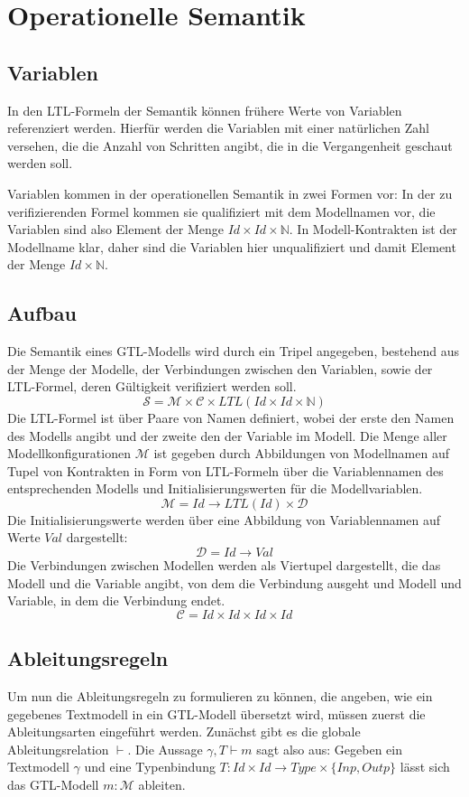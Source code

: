 \section{Operationelle Semantik}
\subsection{Variablen}
In den LTL-Formeln der Semantik können frühere Werte von Variablen referenziert werden.
Hierfür werden die Variablen mit einer natürlichen Zahl versehen, die die Anzahl von Schritten angibt, die in die Vergangenheit geschaut werden soll.

Variablen kommen in der operationellen Semantik in zwei Formen vor:
In der zu verifizierenden Formel kommen sie qualifiziert mit dem Modellnamen vor, die Variablen sind also Element der Menge $\mathit{Id}\times\mathit{Id}\times\mathbb{N}$.
In Modell-Kontrakten ist der Modellname klar, daher sind die Variablen hier unqualifiziert und damit Element der Menge $\mathit{Id}\times\mathbb{N}$.
\subsection{Aufbau}
Die Semantik eines GTL-Modells wird durch ein Tripel angegeben, bestehend aus der Menge der Modelle, der Verbindungen zwischen den Variablen, sowie der LTL-Formel, deren Gültigkeit verifiziert werden soll.
\[ \mathcal{S} = \mathcal{M}\times\mathcal{C}\times\mathit{LTL}(\mathit{Id}\times\mathit{Id}\times\mathbb{N}) \]
Die LTL-Formel ist über Paare von Namen definiert, wobei der erste den Namen des Modells angibt und der zweite den der Variable im Modell.
Die Menge aller Modellkonfigurationen $\mathcal{M}$ ist gegeben durch Abbildungen von Modellnamen auf Tupel von Kontrakten in Form von LTL-Formeln über die Variablennamen des entsprechenden Modells und Initialisierungswerten für die Modellvariablen.
\[ \mathcal{M} = \mathit{Id}\rightarrow \mathit{LTL}(\mathit{Id})\times\mathcal{D} \]
Die Initialisierungswerte werden über eine Abbildung von Variablennamen auf Werte $\mathit{Val}$ dargestellt:
\[ \mathcal{D} = \mathit{Id}\rightarrow\mathit{Val} \]
Die Verbindungen zwischen Modellen werden als Viertupel dargestellt, die das Modell und die Variable angibt, von dem die Verbindung ausgeht und Modell und Variable, in dem die Verbindung endet.
\[ \mathcal{C} = \mathit{Id}\times\mathit{Id}\times\mathit{Id}\times\mathit{Id} \]
\subsection{Ableitungsregeln}
Um nun die Ableitungsregeln zu formulieren zu können, die angeben, wie ein gegebenes Textmodell in ein GTL-Modell übersetzt wird, müssen zuerst die Ableitungsarten eingeführt werden.
Zunächst gibt es die globale Ableitungsrelation $\vdash$.
Die Aussage $\gamma,T\vdash m$ sagt also aus:
Gegeben ein Textmodell $\gamma$ und eine Typenbindung $T : \mathit{Id}\times\mathit{Id}\rightarrow\mathit{Type}\times\{\mathit{Inp},\mathit{Outp}\}$ lässt sich das GTL-Modell $m : \mathcal{M}$ ableiten.

